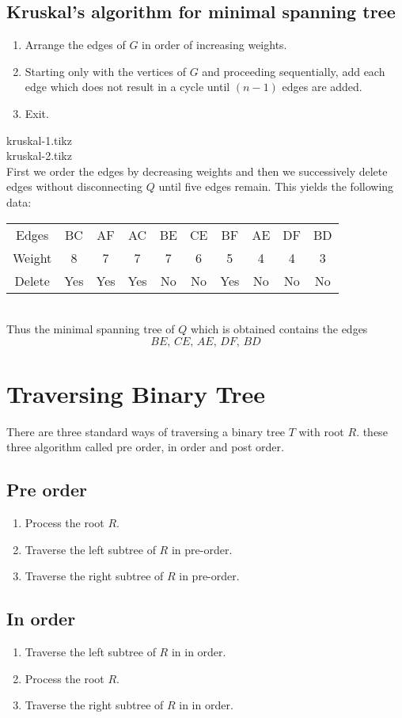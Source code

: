 \documentclass[../main-sheet.tex]{subfiles}
\begin{document}
\subsection{Kruskal's algorithm for minimal spanning tree}
\begin{enumerate}[label=step \arabic*:]
    \item Arrange the edges of $ G $ in order of increasing weights.
    \item Starting only with the vertices of $ G $ and proceeding sequentially, add each edge which does not result in a cycle until $ (n-1) $ edges are added.
    \item Exit.
\end{enumerate}
{kruskal-1.tikz}\\
{kruskal-2.tikz}\\
First we order the edges by decreasing weights and then we successively delete edges without disconnecting $ Q $ until five edges remain. This yields the following data:\\
\begin{tabular}{c c c c c c c c c c}
    Edges & BC & AF & AC & BE & CE & BF & AE & DF & BD \\
    Weight & 8 & 7 & 7 & 7 & 6 & 5 & 4 & 4 & 3\\
    Delete & Yes & Yes & Yes & No  & No & Yes & No & No & No\\
\end{tabular}\\
Thus the minimal spanning tree of $ Q $ which is obtained contains the edges \[BE,\,CE,\,AE,\,DF,\,BD\]
\section{Traversing Binary Tree}
There are three standard ways of traversing a binary tree $ T $ with root $ R $. these three algorithm called pre order, in order and post order.
\subsection{Pre order}
\begin{enumerate}
    \item Process the root $ R $.
    \item Traverse the left subtree of $ R $ in pre-order.
    \item Traverse the right subtree of $ R $ in pre-order.
\end{enumerate}
\subsection{In order}
\begin{enumerate}
    \item Traverse the left subtree of $ R $ in in order.
    \item Process the root $ R $.
    \item Traverse the right subtree of $ R $ in in order.
\end{enumerate}
\end{document}

